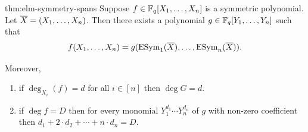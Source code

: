 \begin{Theorem}{}{thm:elm-symmetry-spans}
  Suppose $f\in\mathbb{F}_q[X_1,\dots,X_n]$ is a symmetric polynomial. Let $\overline{X}=(X_1,\dots, X_n)$. Then there exists a polynomial $g\in \mathbb{F}_q[Y_1,\dots,Y_n]$ such that $$f(X_1,\dots, X_n)=g(\operatorname{ESym}_1(\overline{X}),\dots,\operatorname{ESym}_n(\overline{X})).$$

  Moreover, \begin{enumerate}[label=(\roman*)]
    \item if $\deg_{X_i}(f)=d$ for all $i\in[n]$ then $\deg G=d$.
    \item if $\deg f=D$ then for every monomial $Y_1^{d_1}\cdots Y_n^{d_n}$  of $g$ with non-zero coefficient then $d_1+2\cdot d_2+\cdots +n\cdot d_n= D$.
  \end{enumerate}
\end{Theorem}
